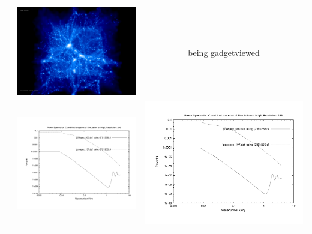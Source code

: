 \begin{itemize}
\begin{table}[p]
\begin{tabular}{l|c|c}
 & \includegraphics[scale=0.075]{r256/h70/rst14lg3/197.jpg} & being gadgetviewed \\
 & \includegraphics[scale=0.25]{r256/h70/rst14lg3/plot_powspec_rst14lg3.pdf} & \includegraphics[scale=0.25]{r256/h100/rst14lg3/plot_powspec_rst14lg3.pdf} \\

\end{tabular}
\end{table}
\end{itemize}
